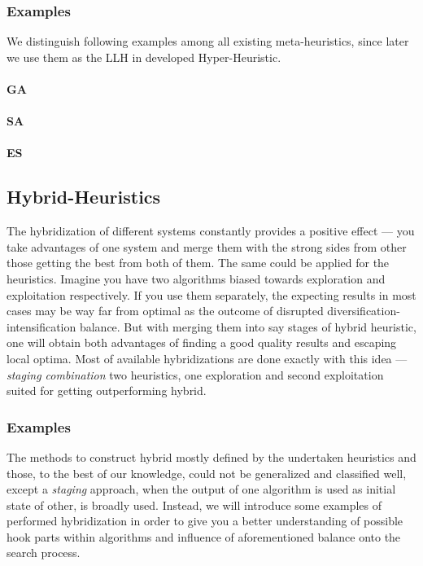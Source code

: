 \subsubsection{Examples}\label{BG: MH Examples}
We distinguish following examples among all existing meta-heuristics, since later we use them as the LLH in developed Hyper-Heuristic.
\paragraph{GA}
\paragraph{SA}
\paragraph{ES}

\subsection{Hybrid-Heuristics}
The hybridization of different systems constantly provides a positive effect — you take advantages of one system and merge them with the strong sides from other those getting the best from both of them. The same could be applied for the heuristics. Imagine you have two algorithms biased towards exploration and exploitation respectively. If you use them separately, the expecting results in most cases may be way far from optimal as the outcome of disrupted diversification-intensification balance. But with merging them into say stages of hybrid heuristic, one will obtain both advantages of finding a good quality results and escaping local optima. Most of available hybridizations are done exactly with this idea — \textit{staging combination} two heuristics, one exploration and second exploitation suited for getting outperforming hybrid.


\subsubsection{Examples}

The methods to construct hybrid mostly defined by the undertaken heuristics and those, to the best of our knowledge, could not be generalized and classified well, except a \textit{staging} approach, when the output of one algorithm is used as initial state of other, is broadly used. Instead, we will introduce some examples of performed hybridization in order to give you a better understanding of possible hook parts within algorithms and influence of aforementioned balance onto the search process.

